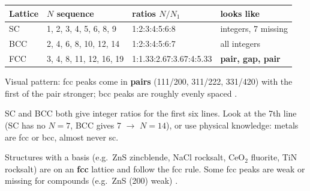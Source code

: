 \begin{keybox}[: the fingerprint sequences of $N = h^2+k^2+l^2$]
\begin{center}
\small
\begin{tabular}{@{}lll>{\raggedright\arraybackslash}p{2.8cm}@{}}
\toprule
Lattice & $N$ sequence & ratios $N/N_1$ & looks like \\ \midrule
SC  & 1, 2, 3, 4, 5, 6, 8, 9 & 1:2:3:4:5:6:8 & integers, 7 missing \\
BCC & 2, 4, 6, 8, 10, 12, 14 & 1:2:3:4:5:6:7 & all integers \\
FCC & 3, 4, 8, 11, 12, 16, 19 & 1:1.33:2.67:3.67:4:5.33 & \textbf{pair, gap, pair} \\
\bottomrule
\end{tabular}
\end{center}
Visual pattern: fcc peaks come in \textbf{pairs} (111/200, 311/222, 331/420) with the first of the pair stronger;
bcc peaks are roughly evenly spaced .
\end{keybox}
\begin{tipbox}
SC and BCC both give integer ratios for the first six lines. Look at the 7th line (SC has no $N=7$, BCC gives 7 $\to$
$N=14$), or use physical knowledge: metals are fcc or bcc, almost never sc.
\end{tipbox}
Structures with a basis (e.g.\ ZnS zincblende, NaCl rocksalt, CeO$_2$ fluorite, TiN rocksalt) are on an \textbf{fcc}
lattice and follow the fcc rule. Some fcc peaks are weak or missing for compounds (e.g.\ ZnS (200) weak) .

